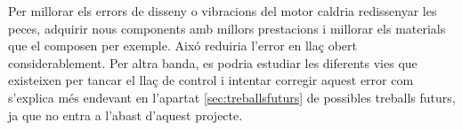 \begin{itemize}
	Per millorar els errors de disseny o vibracions del motor caldria redissenyar les peces, adquirir nous components amb millors prestacions i millorar els materials que el composen per exemple. Aixó reduiria l'error en llaç obert considerablement. Per altra banda, es podria estudiar les diferents vies que existeixen per tancar el llaç de control i intentar corregir aquest error com s'explica més endevant en l'apartat \ref{sec:treballsfuturs} de possibles treballs futurs, ja que no entra a l'abast d'aquest projecte. 
	
	
	
\end{itemize}


